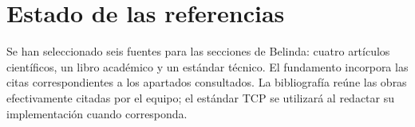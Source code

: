 \section*{Estado de las referencias}
Se han seleccionado seis fuentes para las secciones de Belinda: cuatro artículos
científicos, un libro académico y un estándar técnico. El fundamento incorpora
las citas correspondientes a los apartados consultados. La bibliografía reúne
las obras efectivamente citadas por el equipo; el estándar TCP se utilizará al
redactar su implementación cuando corresponda.
